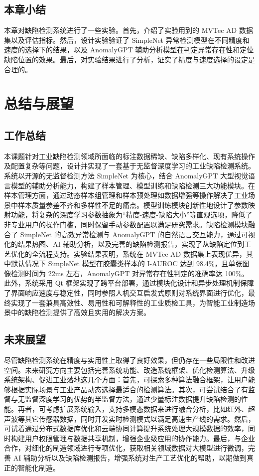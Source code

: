 \documentclass[
  ]{njuthesis}
\begin{document}
\section{本章小结}

本章对缺陷检测系统进行了一些实验。首先，介绍了实验用到的 MVTec AD 数据集以及评估指标。然后，设计实验验证了 SimpleNet 异常检测模型在不同精度和速度的选择下的结果，以及 AnomalyGPT 辅助分析模型在判定异常存在性和定位缺陷位置的效果。最后，对实验结果进行了分析，证实了精度与速度选择的设定是合理的。

\chapter{总结与展望}

\section{工作总结}

本课题针对工业缺陷检测领域所面临的标注数据稀缺、缺陷多样化、现有系统操作及配置复杂等问题，设计并实现了一套基于无监督深度学习的工业缺陷检测系统。系统以开源的无监督检测方法 SimpleNet 为核心，结合 AnomalyGPT 大型视觉语言模型的辅助分析能力，构建了样本管理、模型训练和缺陷检测三大功能模块。在样本管理方面，通过动态样本组管理和样本预处理如数据增强等操作解决了工业场景中样本质量参差不齐和多样性不足的痛点。模型训练模块创新性地设计了参数映射功能，将复杂的深度学习参数抽象为“精度-速度-缺陷大小”等直观选项，降低了非专业用户的操作门槛，同时保留手动参数配置以满足研究需求。缺陷检测模块融合了 SimpleNet 的高效异常检测与 AnomalyGPT 的自然语言交互能力，通过可视化的结果热图、AI 辅助分析，以及完善的缺陷检测报告，实现了从缺陷定位到工艺优化的全流程支持。实验结果表明，系统在 MVTec AD 数据集上表现优异，其中默认情况下 SimpleNet 模型在胶囊类样本的 I-AUROC 达到 98.4\%，且单张图像检测时间为 22ms 左右，AnomalyGPT 对异常存在性判定的准确率达 100\%。此外，系统采用 Qt 框架实现了跨平台部署，通过模块化设计和异步处理机制保障了界面响应速度与稳定性，同时参照人机交互启发式原则对系统界面进行优化，最终实现了一套兼具高效性、易用性和可解释性的工业质检工具，为智能工业制造场景中的缺陷检测提供了高效且实用的解决方案。

\section{未来展望}

尽管缺陷检测系统在精度与实用性上取得了良好效果，但仍存在一些局限性和改进空间。未来研究方向主要包括完善系统功能、改造系统框架、优化检测算法、升级系统架构、促进工业落地这几个方面：首先，可探索多种算法融合框架，让用户能够根据实际场景与工业产品动态选择最适合的检测算法。其次，可尝试结合了有监督与无监督深度学习的优势的半监督方法，通过少量标注数据提升缺陷检测的性能。再者，可考虑扩展系统输入，支持多模态数据来进行融合分析，比如红外、超声波等其它传感器数据，同时开发实时检测模式以满足高速生产线的需求。然后，可试着通过分布式数据库优化和云端协同计算提升系统处理大规模数据的效率，同时构建用户权限管理与数据共享机制，增强企业级应用的协作能力。最后，与企业合作，对细化的制造领域进行专项优化，获取相关领域数据对大模型进行微调，完善 AI 辅助分析以及缺陷检测报告，增强系统对生产工艺优化的帮助，以期做到真正的智能化制造。
\end{document}
